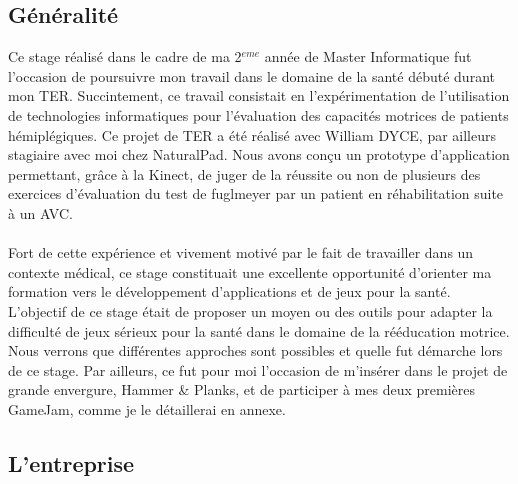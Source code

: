 \subsection{Généralité}	
Ce stage réalisé dans le cadre de ma 2$^{eme}$ année de Master Informatique fut l'occasion de poursuivre mon travail dans le domaine de la santé débuté durant mon TER. Succintement, ce travail consistait en l'expérimentation de l'utilisation de technologies informatiques pour l'évaluation des capacités motrices de patients hémiplégiques. Ce projet de TER a été réalisé avec William DYCE, par ailleurs stagiaire avec moi chez NaturalPad. Nous avons conçu un prototype d'application permettant, grâce à la Kinect, de juger de la réussite ou non de plusieurs des exercices d'évaluation du test de \gls{fuglmeyer} par un patient en réhabilitation suite à un AVC. \paragraph{}
Fort de cette expérience et vivement motivé par le fait de travailler dans un contexte médical, ce stage constituait une excellente opportunité d'orienter ma formation vers le développement d'applications et de jeux pour la santé.\\
L'objectif de ce stage était de proposer un moyen ou des outils pour adapter la difficulté de jeux sérieux pour la santé dans le domaine de la rééducation motrice. Nous verrons que différentes approches sont possibles et quelle fut démarche lors de ce stage. Par ailleurs, ce fut pour moi l'occasion de m'insérer dans le projet de grande envergure, Hammer \& Planks, et de participer à mes deux premières GameJam, comme je le détaillerai en annexe.

\subsection{L'entreprise}

